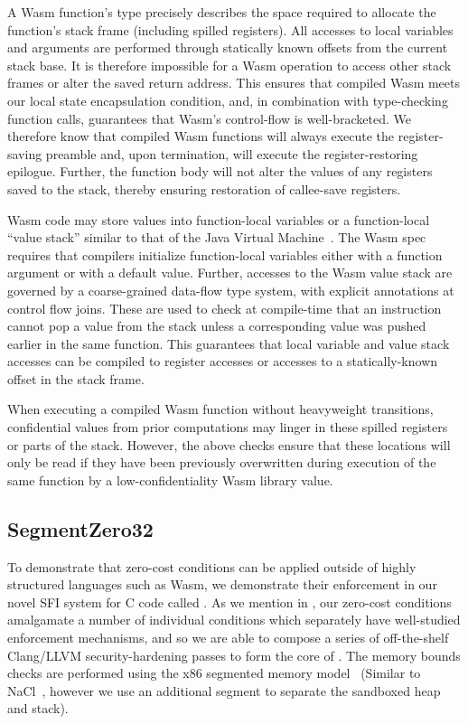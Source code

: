 %
A Wasm function's type precisely describes the space required to allocate the
function's stack frame (including spilled registers).
%
All accesses to local variables and arguments are performed through statically
known offsets from the current stack base.
%
It is therefore impossible for a Wasm 
operation to access other stack frames or alter the 
saved return address.
%
This ensures that compiled Wasm meets our local state encapsulation condition,
and, in combination with type-checking function calls, guarantees that Wasm's
control-flow is well-bracketed.
%
We therefore know that compiled Wasm functions will
always execute the register-saving preamble and, upon
termination, will execute the register-restoring epilogue.
%
Further, the function body will not alter the values of any registers saved to
the stack, thereby ensuring restoration of callee-save registers.

%
Wasm code may store values into function-local variables or a function-local
``value stack'' similar to that of the Java Virtual Machine~\cite{jvm}.
%
The Wasm spec requires that compilers initialize function-local variables either
with a function argument or with a default value.
%
Further, accesses to the Wasm value stack are governed by a coarse-grained
data-flow type system, with explicit annotations at control flow joins.
%
These are used to check at compile-time that an instruction cannot pop a value
from the stack unless a corresponding value was pushed earlier in the same
function.
%
This guarantees that local variable and value stack accesses can be compiled to
register accesses or accesses to a statically-known offset in the stack frame.

When executing a compiled Wasm function without heavyweight transitions,
confidential values from prior computations may linger in these spilled registers or
parts of the stack.
%
However, the above checks ensure that these locations will only be read if they
have been previously overwritten during execution of the same function by a
low-confidentiality Wasm library value.


\subsection{SegmentZero32}
\label{sec:segments-secure}

To demonstrate that zero-cost conditions can be applied outside of highly structured languages such as Wasm, we demonstrate their enforcement in our novel SFI system for C code called \trsegmentsfi.
%
As we mention in , our zero-cost conditions amalgamate a number of individual conditions which separately have well-studied enforcement mechanisms, and so we are able to compose a series of off-the-shelf Clang/LLVM security-hardening passes to form the core of \trsegmentsfi.
%
The memory bounds checks are performed using the x86 segmented memory model~\cite{intel-manual} (Similar to NaCl~\cite{yee_native_2009}, however we use an additional segment to separate the sandboxed heap and stack).

